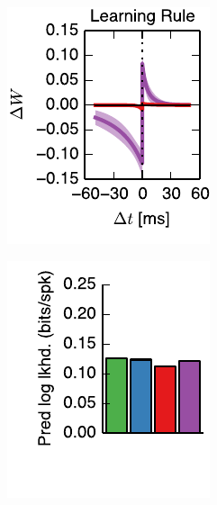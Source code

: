 \begin{figure}[t]
\begin{subfigure}[T]{1.45in}
    \includegraphics[width=\textwidth]{figures/ch4/fig3_static_stdp_rule}    
    \label{fig:fig3_static_stdp_rule}
  \end{subfigure}
  \begin{subfigure}[T]{1.45in}
    \includegraphics[width=\textwidth]{figures/ch4/fig3_static_pred_ll}    

\end{subfigure}
\end{figure}
